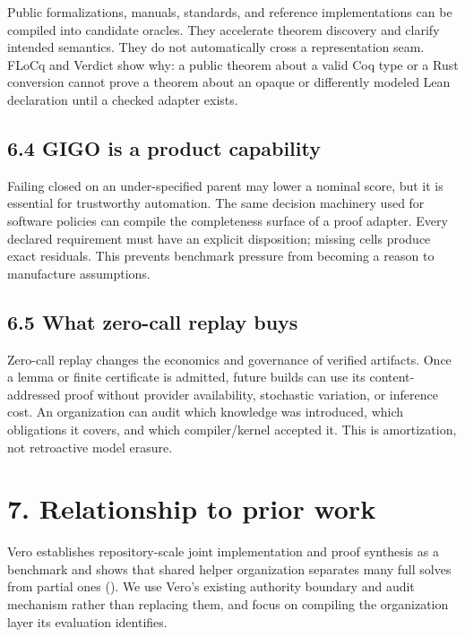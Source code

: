\documentclass[
  10pt,
]{article}
\begin{document}
Public formalizations, manuals, standards, and reference implementations
can be compiled into candidate oracles. They accelerate theorem
discovery and clarify intended semantics. They do not automatically
cross a representation seam. FLoCq and Verdict show why: a public
theorem about a valid Coq type or a Rust conversion cannot prove a
theorem about an opaque or differently modeled Lean declaration until a
checked adapter exists.

\subsection{6.4 GIGO is a product
capability}\label{gigo-is-a-product-capability}

Failing closed on an under-specified parent may lower a nominal score,
but it is essential for trustworthy automation. The same decision
machinery used for software policies can compile the completeness
surface of a proof adapter. Every declared requirement must have an
explicit disposition; missing cells produce exact residuals. This
prevents benchmark pressure from becoming a reason to manufacture
assumptions.

\subsection{6.5 What zero-call replay
buys}\label{what-zero-call-replay-buys}

Zero-call replay changes the economics and governance of verified
artifacts. Once a lemma or finite certificate is admitted, future builds
can use its content-addressed proof without provider availability,
stochastic variation, or inference cost. An organization can audit which
knowledge was introduced, which obligations it covers, and which
compiler/kernel accepted it. This is amortization, not retroactive model
erasure.

\section{7. Relationship to prior
work}\label{relationship-to-prior-work}

Vero establishes repository-scale joint implementation and proof
synthesis as a benchmark and shows that shared helper organization
separates many full solves from partial ones
(). We use Vero's existing
authority boundary and audit mechanism rather than replacing them, and
focus on compiling the organization layer its evaluation identifies.
\end{document}
